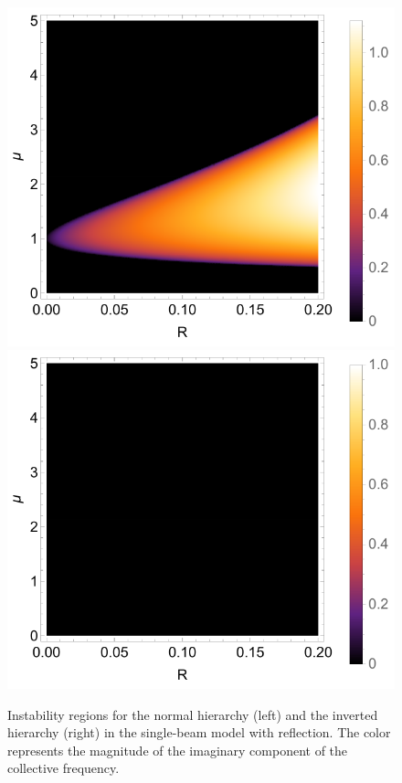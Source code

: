 \begin{figure}[htbp]
    \includegraphics[width=\textwidth]{chapters/assets/halo/growth-rate-mu-refl-nh}
    \endminipage\hfill
    \includegraphics[width=\textwidth]{chapters/assets/halo/growth-rate-mu-refl-ih}
    \endminipage\hfill
    \caption{Instability regions for the normal hierarchy (left) and the inverted hierarchy (right) in the single-beam model with reflection. The color represents the magnitude of the imaginary component of the collective frequency.}
    \label{chap:halo-sec:line-sym-fig:instability-regions}
\end{figure}


